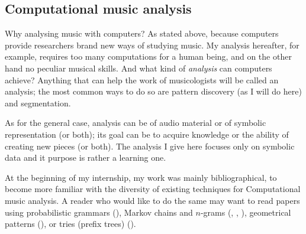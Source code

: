 \documentclass[a4paper,10pt]{article}
\begin{document}
\subsection{Computational music analysis}

Why analysing music with computers? As stated above, because computers provide researchers brand new ways of studying music. My analysis hereafter, for example, requires too many computations for a human being, and on the other hand no peculiar musical skills. And what kind of \emph{analysis} can computers achieve? Anything that can help the work of musicologists will be called an analysis; the most common ways to do so are pattern discovery (as I will do here) and segmentation.

As for the general case, analysis can be of audio material or of symbolic representation (or both); its goal can be to acquire knowledge or the ability of creating new pieces (or both). The analysis I give here focuses only on symbolic data and it purpose is rather a learning one.

At the beginning of my internship, my work was mainly bibliographical, to become more familiar with the diversity of existing techniques for Computational music analysis. A reader who would like to do the same may want to read papers using probabilistic grammars (\cite{goldabdallah}), Markov chains and $n$-grams (\cite{markov1}, \cite{markov2}, \cite{markov3}), geometrical patterns (\cite{cosiatec}), or tries (prefix trees) (\cite{patminr}).


%
\end{document}
